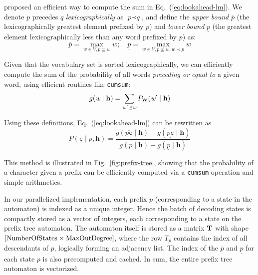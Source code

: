 \documentclass{article}
\def\prefix{\textit{p}}
\def\prefixq{\textit{q}}
\def\word{{\textit{w}}}
\def\ch{\mathtt{c}}
\def\history{\mathbf{h}}
\begin{document}
\cite{hori2018endtoend} proposed an efficient way to compute the sum in Eq.~(\ref{eq:lookahead-lm}). We denote $\prefix$ precedes $\prefixq$ \emph{lexicographically} as $\prefix \prec \prefixq$, and define the \emph{upper bound} $\overline{\prefix}$ (the lexicographically greatest element prefixed by $\prefix$) and \emph{lower bound} $\underline{\prefix}$ (the greatest element lexicographically less than any word prefixed by $\prefix$) as:
\begin{equation}
  \overline{\prefix} = \max_{\word \in V, \prefix \sqsubseteq \word} \word; \quad \underline{\prefix} = \max_{\word \in V, \prefix \not\sqsubseteq \word, \word \prec \prefix} \word
\end{equation}

Given that the vocabulary set is sorted lexicographically, we can efficiently compute the sum of the probability of all words \emph{preceding or equal to} a given word, using efficient routines like \texttt{cumsum}:
\begin{equation}
    g(\word \mid \history) = \sum_{\word^\prime \preceq \word} P_{\rm W}(\word^\prime \mid \history)
\end{equation}

Using these definitions, Eq.~(\ref{eq:lookahead-lm}) can be rewritten as
\begin{equation}
\label{eq:fast-lm}
    P(\ch \mid \prefix, \history) = \dfrac{g(\overline{\prefix \ch} \mid \history) - g(\underline{\prefix \ch} \mid \history)}{g(\overline{\prefix} \mid \history) - g(\underline{\prefix} \mid \history)}    
\end{equation}

This method is illustrated in Fig.~\ref{fig:prefix-tree}, showing that the probability of a character given a prefix can be efficiently computed via a \texttt{cumsum} operation and simple arithmetics.

In our parallelized implementation, each prefix $p$ (corresponding to a state in the automaton) is indexed as a unique integer. Hence the batch of decoding states is compactly stored as a vector of integers, each corresponding to a state on the prefix tree automaton. The automaton itself is stored as a matrix $\bf T$ with shape $[{\rm NumberOfStates}\times{\rm MaxOutDegree}]$, where the row $T_\prefix$ contains the index of all descendants of $\prefix$, logically forming an adjacency list. The index of the $\overline{\prefix}$ and $\underline{\prefix}$ for each state $\prefix$ is also precomputed and cached. In sum, the entire prefix tree automaton is vectorized.
\end{document}
